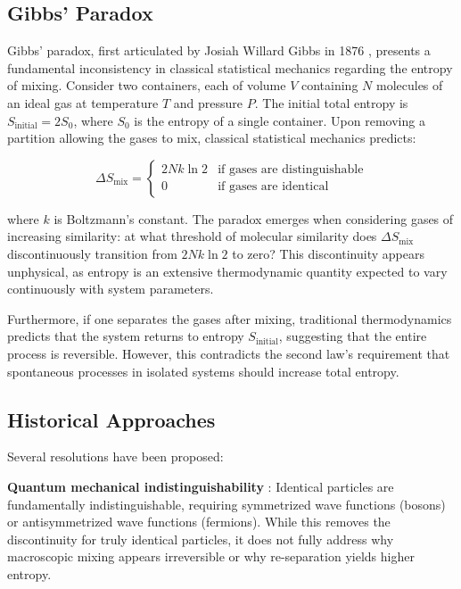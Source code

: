 \documentclass[12pt,a4paper]{article}
\theoremstyle{remark}
\begin{document}
\subsection{Gibbs' Paradox}

Gibbs' paradox, first articulated by Josiah Willard Gibbs in 1876 \cite{gibbs1876equilibrium}, presents a fundamental inconsistency in classical statistical mechanics regarding the entropy of mixing. Consider two containers, each of volume $V$ containing $N$ molecules of an ideal gas at temperature $T$ and pressure $P$. The initial total entropy is $S_\text{initial} = 2S_0$, where $S_0$ is the entropy of a single container. Upon removing a partition allowing the gases to mix, classical statistical mechanics predicts:

\begin{equation}
\Delta S_\text{mix} =
\begin{cases}
2Nk \ln 2 & \text{if gases are distinguishable} \\
0 & \text{if gases are identical}
\end{cases}
\label{eq:gibbs_standard}
\end{equation}

where $k$ is Boltzmann's constant. The paradox emerges when considering gases of increasing similarity: at what threshold of molecular similarity does $\Delta S_\text{mix}$ discontinuously transition from $2Nk \ln 2$ to zero? This discontinuity appears unphysical, as entropy is an extensive thermodynamic quantity expected to vary continuously with system parameters.

Furthermore, if one separates the gases after mixing, traditional thermodynamics predicts that the system returns to entropy $S_\text{initial}$, suggesting that the entire process is reversible. However, this contradicts the second law's requirement that spontaneous processes in isolated systems should increase total entropy.

\subsection{Historical Approaches}

Several resolutions have been proposed:

\textbf{Quantum mechanical indistinguishability} \cite{bach1997gibbs,saunders2006gibbs}: Identical particles are fundamentally indistinguishable, requiring symmetrized wave functions (bosons) or antisymmetrized wave functions (fermions). While this removes the discontinuity for truly identical particles, it does not fully address why macroscopic mixing appears irreversible or why re-separation yields higher entropy.
\end{document}
